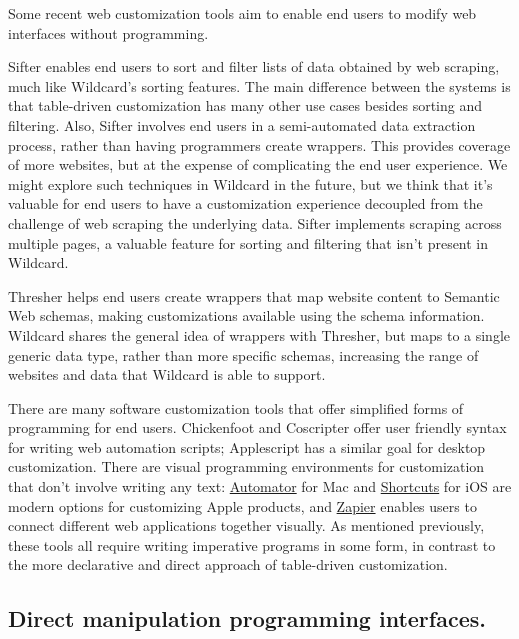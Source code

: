 \documentclass[sigplan,screen,10pt,anonymous,review]{acmart}
\begin{document}
Some recent web customization tools aim to enable end users to modify
web interfaces without programming.

Sifter \citep{huynh2006} enables end users to sort and filter lists of
data obtained by web scraping, much like Wildcard's sorting features.
The main difference between the systems is that table-driven
customization has many other use cases besides sorting and filtering.
Also, Sifter involves end users in a semi-automated data extraction
process, rather than having programmers create wrappers. This provides
coverage of more websites, but at the expense of complicating the end
user experience. We might explore such techniques in Wildcard in the
future, but we think that it's valuable for end users to have a
customization experience decoupled from the challenge of web scraping
the underlying data. Sifter implements scraping across multiple pages, a
valuable feature for sorting and filtering that isn't present in
Wildcard.

Thresher \citep{hogue2005} helps end users create wrappers that map
website content to Semantic Web schemas, making customizations available
using the schema information. Wildcard shares the general idea of
wrappers with Thresher, but maps to a single generic data type, rather
than more specific schemas, increasing the range of websites and data
that Wildcard is able to support.

There are many software customization tools that offer simplified forms
of programming for end users. Chickenfoot \citep{bolin2005} and
Coscripter \citep{leshed2008} offer user friendly syntax for writing web
automation scripts; Applescript \citep{cook2007} has a similar goal for
desktop customization. There are visual programming environments for
customization that don't involve writing any text:
\href{https://support.apple.com/guide/automator/welcome/mac}{Automator}
for Mac and
\href{https://apps.apple.com/us/app/shortcuts/id915249334}{Shortcuts}
for iOS are modern options for customizing Apple products, and
\href{https://zapier.com/}{Zapier} enables users to connect different
web applications together visually. As mentioned previously, these tools
all require writing imperative programs in some form, in contrast to the
more declarative and direct approach of table-driven customization.

\hypertarget{direct-manipulation-programming-interfaces.}{%
\subsection{Direct manipulation programming
interfaces.}\label{direct-manipulation-programming-interfaces.}}
\end{document}
